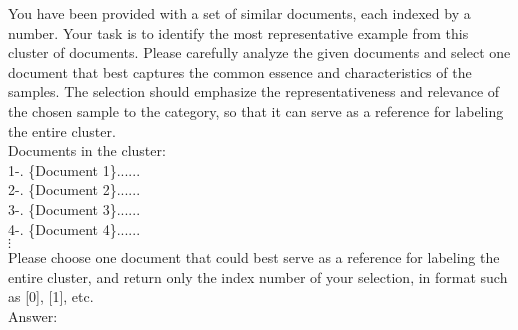 \documentclass{article}
\begin{document}
\begin{tcolorbox}[colback=white, title = \textbf{Table C.5}: Prompt to Choose Representative Landmarks for Each Cluster ,colframe=black, sharp corners]
  You have been provided with a set of similar documents, each indexed by a number. Your task is to identify the most representative example from this cluster of documents. Please carefully analyze the given documents and select one document that best captures the common essence and characteristics of the samples. The selection should emphasize the representativeness and relevance of the chosen sample to the category, so that it can serve as a reference for labeling the entire cluster.\\
  
  Documents in the cluster:\\
  
  1-. \{Document 1\}...... \\
  
  2-. \{Document 2\}......\\
    
  3-. \{Document 3\}......\\
    
  4-. \{Document 4\}......\\
   
   $\vdots$\\
   
  Please choose one document that could best serve as a reference for labeling the entire cluster, and return only the index number of your selection, in format such as [0], [1], etc.\\
  
  Answer:\\
\end{tcolorbox}
  
\end{document}
